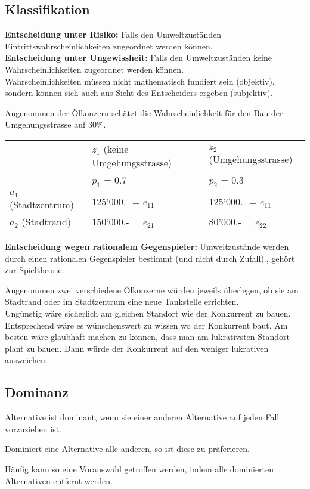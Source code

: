 \subsection{Klassifikation}
\textbf{Entscheidung unter Risiko:} Falls den Umweltzuständen Eintrittswahrscheinlichkeiten zugeordnet werden können. \\
\textbf{Entscheidung unter Ungewissheit:} Falls den Umweltzuständen keine Wahrscheinlichkeiten zugeordnet werden können. \\
Wahrscheinlichkeiten müssen nicht mathematisch fundiert sein (objektiv), sondern können sich auch aus Sicht des Entscheiders ergeben (subjektiv).
\begin{example}
	Angenommen der Ölkonzern schätzt die Wahrscheinlichkeit für den Bau	der Umgehungsstrasse auf 30\%. \\
	\begin{tabular}{|l|l|l|}
		\hline
		& $z_1$ (keine Umgehungsstrasse) & $z_2$ (Umgehungsstrasse) \\ 
		& $p_1$ = 0.7 & $p_2$ = 0.3 \\ \hline
		$a_1$ (Stadtzentrum) & 125'000.- = $e_{11}$ & 125'000.- = $e_{11}$ \\ \hline
		$a_2$ (Stadtrand) & 150'000.- = $e_{21}$ & 80'000.- = $e_{22}$ \\ \hline
	\end{tabular}
\end{example}
\textbf{Entscheidung wegen rationalem Gegenspieler:} Umweltzustände werden durch einen rationalen Gegenspieler bestimmt (und nicht durch Zufall)., gehört zur Spieltheorie.
\begin{example}
	Angenommen zwei verschiedene Ölkonzerne würden jeweils überlegen, ob sie am Stadtrand oder im Stadtzentrum eine neue Tankstelle errichten. \\
	Ungünstig wäre sicherlich am gleichen Standort wie der Konkurrent zu bauen. Entsprechend wäre es wünschenswert zu wissen wo der
	Konkurrent baut. Am besten wäre glaubhaft machen zu können, dass man am lukrativsten Standort plant zu bauen. Dann würde der Konkurrent auf den weniger lukrativen ausweichen.
\end{example}

\subsection{Dominanz}
\begin{compactitem}
	\item Alternative ist dominant, wenn sie einer anderen Alternative auf jeden Fall vorzuziehen ist.
	\item Dominiert eine Alternative alle anderen, so ist diese zu präferieren.
	\item Häufig kann so eine Vorauswahl getroffen werden, indem alle dominierten Alternativen entfernt werden.
\end{compactitem}

